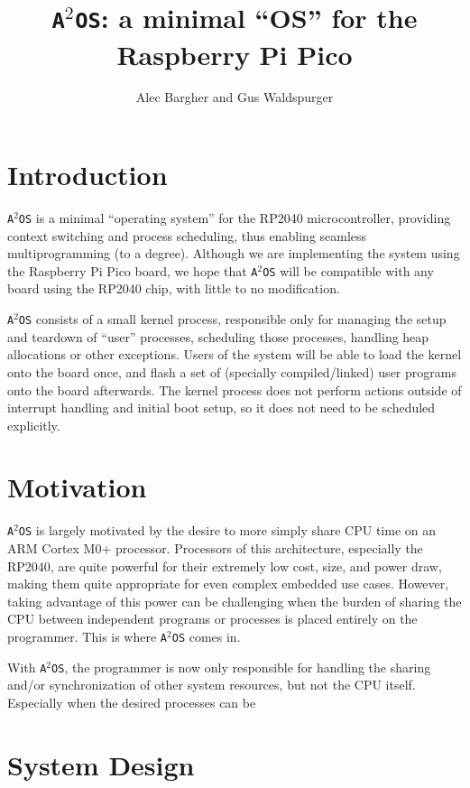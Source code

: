 \documentclass[12pt]{article}
\title{\texttt{A$^2$OS}: a minimal ``OS'' for the Raspberry Pi Pico}
\author{Alec Bargher and Gus Waldspurger}
\date{}
\newcommand{\os}{\texttt{A$^2$OS} }
\newcommand{\osns}{\texttt{A$^2$OS}}
\begin{document}
\maketitle

\section{Introduction}
\os is a minimal ``operating system'' for the RP2040 microcontroller, providing
context switching and process scheduling, thus enabling seamless
multiprogramming (to a degree). Although we are implementing the system using
the Raspberry Pi Pico board, we hope that \os will be compatible with any board
using the RP2040 chip, with little to no modification.
\vspace{1em}

\os consists of a small kernel process, responsible
only for managing the setup and teardown of ``user'' processes, scheduling those
processes, handling heap allocations or other exceptions. Users of the system
will be able to load the kernel onto the board once, and flash a set of
(specially compiled/linked) user programs onto the board afterwards. The kernel
process does not perform actions outside of interrupt handling and initial boot
setup, so it does not need to be scheduled explicitly.

\section{Motivation}

\os is largely motivated by the desire to more simply share CPU time on an ARM
Cortex M0+ processor. Processors of this architecture, especially the RP2040,
are quite powerful for their extremely low cost, size, and power draw, making
them quite appropriate for even complex embedded use cases. However, taking
advantage of this power can be challenging when the burden of sharing the CPU
between independent programs or processes is placed entirely on the programmer.
This is where \os comes in.

With \osns, the programmer is now only responsible for handling the sharing
and/or synchronization of other system resources, but not the CPU itself.
Especially when the desired processes can be 


\section{System Design}
\end{document}
